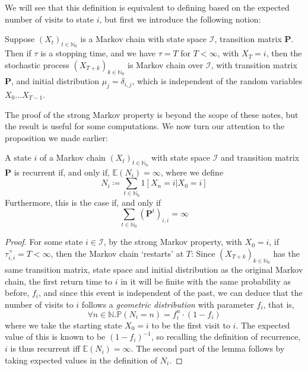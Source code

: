 			We will see that this definition is equivalent to defining based on the expected number
			of visits to state $i$, but first we introduce the following notion:
			\begin{theorem}
				Suppose $(X_{t})_{t \in \mathbb{N}_0}$ is a Markov chain with state space
				$\mathcal{I}$, transition matrix $\mathbf{P}$.\\
				Then if $\tau$ is a stopping time, and we have $\tau = T$ for $T < \infty$, with
				$X_T = i$, then the stochastic process $(X_{T+k})_{k\in \mathbb{N}_0}$ is 
				Markov chain over $\mathcal{I}$, with transition matrix $\mathbf{P}$, and 
				initial distribution $\mu_j = \delta_{i,j}$, which is independent of the random
				variables $X_{0} \hdots X_{T-1}$.
			\end{theorem}
			The proof of the strong Markov property is beyond the scope of these notes, but the 
			result is useful for some computations. We now turn our attention to the proposition we 
			made earlier:
			\begin{lemma}
				A state $i$ of a Markov chain $(X_t)_{t \in \mathbb{N}_0}$ with state space 
				$\mathcal{I}$ and transition matrix $\mathbf{P}$ is recurrent if, and only if,
				$\mathbb{E}(N_i) = \infty$, where we define 
				$$
					N_i \coloneqq \sum_{t \in \mathbb{N}_0} 1[X_n = i | X_0 = i]
				$$
				Furthermore, this is the case if, and only if 
				$$	
					\sum_{t \in \mathbb{N}_0} (\mathbf{P}^{t})_{i,i} = \infty
				$$
			\end{lemma}
			\begin{proof}
				For some state $i \in  \mathcal{I}$, 
				by the strong Markov property, with $X_0 = i$, if $\tau^+_{i,i} = T < \infty$, 
				then the Markov chain `restarts' at $T$: Since $(X_{T+k})_{k \in \mathbb{N}_0}$ 
				has the same transition matrix, state space and initial distribution as the 
				original Markov chain, the first return time to $i$ in it will be finite with 
				the same probability as before, $f_i$, and since this event is independent of
				the past, we can deduce that the number of visits to $i$ follows a 
				\emph{geometric distribution} with parameter $f_i$, that is,
				$$
					\forall n \in \mathbb{N} . \mathbb{P}(N_i = n) = f_i^n \cdot (1-f_i)
				$$
				where we take the starting state $X_0 = i$ to be the first visit to $i$. The
				expected value of this is known to be $(1-f_i)^{-1}$, so recalling the 
				definition of recurrence, $i$ is thus recurrent iff $\mathbb{E}(N_i)=\infty$.
				\newline
				The second part of the lemma follows by taking expected values in the definition
				of $N_i$.
			\end{proof}

